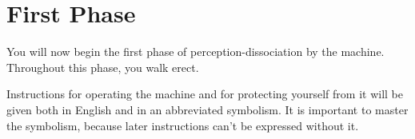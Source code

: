 \newcommand\steppy[1]{
	\tikz[baseline=(n.base)]{
		\node(n)[inner sep=1pt]{$#1$};
		\draw[line cap=round](n.south west) parabola 
		bend ($ (0.4em,0.3em)+(n.north west) $)
		($ (0.1em,0)+(n.north) $);
	}
}

\newcommand{\jumpsover}[2]{\ensuremath{#1\:\jumpbox{\:#2\:}}}
\newcommand{\shadows}[2]{\ensuremath{#1^\infty#2}}
\newcommand{\tackles}[2]{\ensuremath{#1\tacklebox{\,#2}}}
\newcommand{\stepson}[2]{\ensuremath{#1\:\steppy{\:#2}}}
\newcommand{\flee}[1]{\ensuremath{#1\raisebox{-1pt}{\intprod}}}
\newcommand{\probly}[1]{\ensuremath{(#1)}}


\clearpage
{}
\section{First Phase}
You will now begin the first phase of perception-dissociation by the 
machine. Throughout this phase, you walk erect. 

Instructions for operating the machine and for protecting yourself from 
it will be given both in English and in an abbreviated symbolism. It is 
important to master the symbolism, because later instructions can't be 
expressed without it. 

